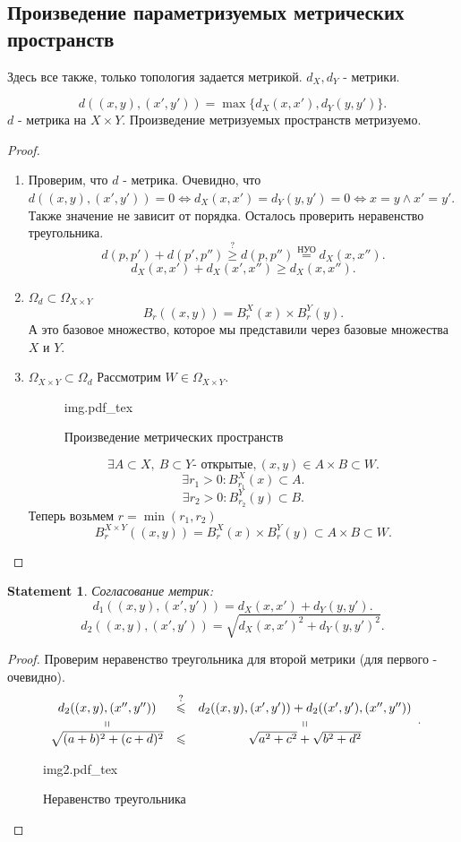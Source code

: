 \documentclass[11pt]{book}
\newcommand{\incfig}[1]{%
    \def\svgwidth{\columnwidth}
    {#1.pdf_tex}
}
\renewcommand{\le}{\leqslant}
\renewcommand{\ge}{\geqslant}
\theoremstyle{definition}
\theoremstyle{plain}
\theoremstyle{plain}
\newtheorem*{st}{Statement}
\theoremstyle{definition}
\theoremstyle{remark}
\begin{document}
\subsection{Произведение параметризуемых метрических пространств}
Здесь все также, только топология задается метрикой.
$d_X, d_Y$ - метрики.
\begin{thm}
    \[
	d((x, y) , (x', y')) = \max \{d_X(x, x'), d_Y(y, y')\}
    .\]
    $d$ - метрика на $X \times Y$.
    Произведение метризуемых пространств метризуемо.
\end{thm}
\begin{proof}
    \begin{enumerate}
	\item
	    Проверим, что $d$ - метрика.
	    Очевидно, что $d((x, y), (x', y')) = 0 \Longleftrightarrow d_X(x, x') = d_Y(y, y') = 0 \Longleftrightarrow x = y \wedge x' = y'$. Также значение не зависит от порядка. Осталось проверить неравенство треугольника.
	    \[
		d(p, p') + d(p', p'') \stackrel{?}\ge  d(p, p'') \stackrel{\text{НУО}} = d_X(x, x'')
	    .\]
	    \[
		d_X(x, x') + d_X(x', x'') \ge d_X(x, x'')
	    .\]
	\item $\Omega_d \subset \Omega _{X \times Y} $
	    \[
		B_r((x, y)) = B_r^X(x) \times B_r^Y(y)
	    .\]
	    А  это базовое множество, которое мы представили через базовые множества $X$ и $Y$.

	\item $\Omega _{X \times Y} \subset \Omega_d$
	    Рассмотрим  $W \in \Omega _{X \times Y}$.
	    \begin{figure}[ht]
		\centering
		\incfig{img}
		\caption{Произведение метрических пространств}
		\label{fig:img}
	    \end{figure}
	    \[
		\exists A \subset X, ~ B \subset Y \mbox{- открытые}, (x, y) \in  A\times B \subset W
	    .\]
	    \[
		\exists r_1 > 0: B_{r_1}^X(x) \subset A
	    .\]
	    \[
		\exists r_2 > 0: B_{r_2}^Y(y) \subset B
	    .\]
	    Теперь возьмем $r = \min (r_1, r_2)$
	    \[
		B_r^{X \times Y} ((x, y)) = B_r^X(x) \times B_r^Y(y) \subset A \times B \subset W
	    .\]
    \end{enumerate}
\end{proof}
\begin{st}
    Согласование метрик:
    \[
	d_1 ((x, y), (x', y')) = d_X(x, x') + d_Y(y, y')
    .\]
    \[
	d_2((x, y), (x', y')) = \sqrt{d_X(x, x')^2 + d_Y (y, y')^2}
    .\]
\end{st}
\begin{proof}
    Проверим неравенство треугольника для второй метрики (для первого - очевидно).
    \[
	\begin{array}{ccc}
	    d_2((x, y), (x'', y'')) &\stackrel{?}\le & d_2((x, y), (x', y')) + d_2((x', y'), (x'', y'')) \\
	    \shortparallel & & \shortparallel \\
	    \sqrt{(a + b)^2 + (c+d)^2} & \le & \sqrt {a^2+c^2} + \sqrt {b^2+d^2}
	\end{array}
    .\]
    \begin{figure}[ht]
	\centering
	\incfig{img2}
	\caption{Неравенство треугольника}
	\label{fig:img2}
    \end{figure}
\end{proof}
\end{document}
